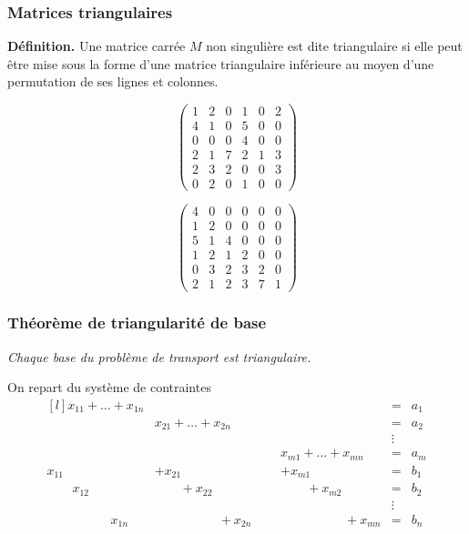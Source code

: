 \documentclass[usepdftitle=false]{beamer}
\begin{document}
\begin{frame}
\frametitle{Matrices triangulaires}

{\bf Définition.}
Une matrice carrée $M$ non singulière est dite triangulaire si elle
peut être mise sous la forme d'une matrice triangulaire inférieure au moyen d'une permutation de ses lignes et colonnes.

\mbox{}

\begin{center}
\begin{minipage}{.4\linewidth}
\[
\begin{pmatrix}
1 & 2 & 0 & 1 & 0 & 2 \\
4 & 1 & 0 & 5 & 0 & 0 \\
0 & 0 & 0 & 4 & 0 & 0 \\
2 & 1 & 7 & 2 & 1 & 3 \\
2 & 3 & 2 & 0 & 0 & 3 \\
0 & 2 & 0 & 1 & 0 & 0
\end{pmatrix}
\]
\end{minipage}
\begin{minipage}{.4\linewidth}
\[
\begin{pmatrix}
4 & 0 & 0 & 0 & 0 & 0 \\
1 & 2 & 0 & 0 & 0 & 0 \\
5 & 1 & 4 & 0 & 0 & 0 \\
1 & 2 & 1 & 2 & 0 & 0 \\
0 & 3 & 2 & 3 & 2 & 0 \\
2 & 1 & 2 & 3 & 7 & 1
\end{pmatrix}
\]
\end{minipage}
\end{center}

\end{frame}

\begin{frame}
\frametitle{Théorème de triangularité de base}

{\sl Chaque base du problème de transport est triangulaire.}

\mbox{}

On repart du système de contraintes
\[
\begin{matrix}[l]
x_{11} + \ldots + x_{1n} & & & & = & a_1 \\
& x_{21} + \ldots + x_{2n} & & & = &  a_2 \\
& & & & \vdots \\
& & \mbox{ } & x_{m1} + \ldots + x_{mn} & = &  a_m \\
x_{11} & + x_{21} & & + x_{m1} & = & b_1 \\
\quad \quad x_{12} & \quad \quad + x_{22} & & \quad \quad + x_{m2} & = & b_2 \\
& & & & \vdots \\
\quad \quad \quad \qquad x_{1n} &  \quad \quad \quad \qquad +x_{2n} & &  \quad \quad \quad \qquad +x_{mn} & = & b_n 
\end{matrix}
\]

\end{frame}
\end{document}
